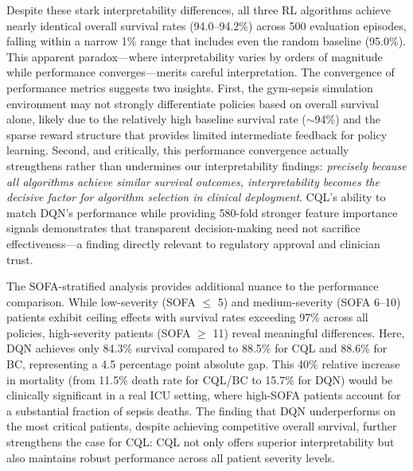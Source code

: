 Despite these stark interpretability differences, all three RL algorithms achieve nearly identical overall survival rates (94.0--94.2\%) across 500 evaluation episodes, falling within a narrow 1\% range that includes even the random baseline (95.0\%). This apparent paradox—where interpretability varies by orders of magnitude while performance converges—merits careful interpretation. The convergence of performance metrics suggests two insights. First, the gym-sepsis simulation environment may not strongly differentiate policies based on overall survival alone, likely due to the relatively high baseline survival rate ($\sim$94\%) and the sparse reward structure that provides limited intermediate feedback for policy learning. Second, and critically, this performance convergence actually strengthens rather than undermines our interpretability findings: \textit{precisely because all algorithms achieve similar survival outcomes, interpretability becomes the decisive factor for algorithm selection in clinical deployment}. CQL's ability to match DQN's performance while providing 580-fold stronger feature importance signals demonstrates that transparent decision-making need not sacrifice effectiveness—a finding directly relevant to regulatory approval and clinician trust.

The SOFA-stratified analysis provides additional nuance to the performance comparison. While low-severity (SOFA $\leq$ 5) and medium-severity (SOFA 6--10) patients exhibit ceiling effects with survival rates exceeding 97\% across all policies, high-severity patients (SOFA $\geq$ 11) reveal meaningful differences. Here, DQN achieves only 84.3\% survival compared to 88.5\% for CQL and 88.6\% for BC, representing a 4.5 percentage point absolute gap. This 40\% relative increase in mortality (from 11.5\% death rate for CQL/BC to 15.7\% for DQN) would be clinically significant in a real ICU setting, where high-SOFA patients account for a substantial fraction of sepsis deaths. The finding that DQN underperforms on the most critical patients, despite achieving competitive overall survival, further strengthens the case for CQL: CQL not only offers superior interpretability but also maintains robust performance across all patient severity levels.

